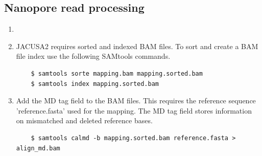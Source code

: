 \documentclass[times, 11pt, a4paper]{article}
\begin{document}
\subsection*{Nanopore read processing}
\begin{enumerate}
	\item {}
	\item  JACUSA2 requires sorted and indexed BAM files. To sort and create a BAM file index use the following SAMtools commands.
	\begin{verbatim}
	$ samtools sorte mapping.bam mapping.sorted.bam
	$ samtools index mapping.sorted.bam
	\end{verbatim}
	\item Add the MD tag field to the BAM files. This requires the reference sequence 'reference.fasta' used for the mapping. The MD tag field stores information on mismatched and deleted reference bases.
	\begin{verbatim}
	$ samtools calmd -b mapping.sorted.bam reference.fasta > align_md.bam
	\end{verbatim}
\end{enumerate}	
\end{document}
